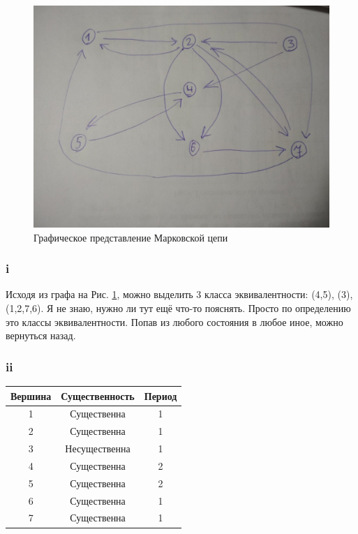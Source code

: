 \documentclass[a4paper,12pt]{article}
\begin{document}
\begin{figure}[!h]
	\begin{center}
		\includegraphics[width=0.6\linewidth]{51}
		\caption{Графическое представление Марковской цепи}
		\label{graph}
	\end{center}
\end{figure}


\subsubsection{i} 

Исходя из графа на Рис. \ref{graph}, можно выделить 3 класса эквивалентности: (4,5), (3), (1,2,7,6). Я не знаю, нужно ли тут ещё что-то пояснять. Просто по определению это классы эквивалентности. Попав из любого состояния в любое иное, можно вернуться назад.



\subsubsection{ii} 


\begin{table}[]
	\begin{center}
		\begin{tabular}{|c|c|c|}
			\hline
			\rowcolor[HTML]{9AFF99} 
			\textbf{Вершина} & \textbf{Существенность} & \textbf{Период} \\ \hline
			1                & Существенна             & 1               \\ \hline
			2                & Существенна             & 1               \\ \hline
			3                & Несущественна           & 1               \\ \hline
			4                & Существенна             & 2               \\ \hline
			5                & Существенна             & 2               \\ \hline
			6                & Существенна             & 1               \\ \hline
			7                & Существенна             & 1               \\ \hline
		\end{tabular}
	\end{center}
\end{table}
\end{document}
